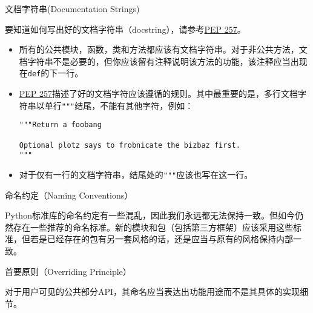 \documentclass[ignorenonframetext,9pt]{beamer}
\begin{document}
\begin{frame}[fragile]

\begin{block}{文档字符串(Documentation Strings)}

要知道如何写出好的文档字符串（docstring），请参考\href{https://www.python.org/dev/peps/pep-0257}{PEP
257}。

\begin{itemize}
\item
  所有的公共模块，函数，类和方法都应该有文档字符串。对于非公共方法，文档字符串不是必要的，但你应该留有注释说明该方法的功能，该注释应当出现在\texttt{def}的下一行。
\item
  \href{https://www.python.org/dev/peps/pep-0257}{PEP
  257}描述了好的文档字符应该遵循的规则。其中最重要的是，多行文档字符串以单行\texttt{"""}结尾，不能有其他字符，例如：

\begin{verbatim}
"""Return a foobang

Optional plotz says to frobnicate the bizbaz first.
"""
\end{verbatim}
\item
  对于仅有一行的文档字符串，结尾处的\texttt{"""}应该也写在这一行。
\end{itemize}

\end{block}

\end{frame}

\begin{frame}{命名约定（Naming Conventions）}
\protect\hypertarget{ux547dux540dux7ea6ux5b9anaming-conventions}{}

Python标准库的命名约定有一些混乱，因此我们永远都无法保持一致。但如今仍然存在一些推荐的命名标准。新的模块和包（包括第三方框架）应该采用这些标准，但若是已经存在的包有另一套风格的话，还是应当与原有的风格保持内部一致。

\begin{block}{首要原则（Overriding Principle）}

对于用户可见的公共部分API，其命名应当表达出功能用途而不是其具体的实现细节。

\end{block}

\end{frame}
\end{document}
